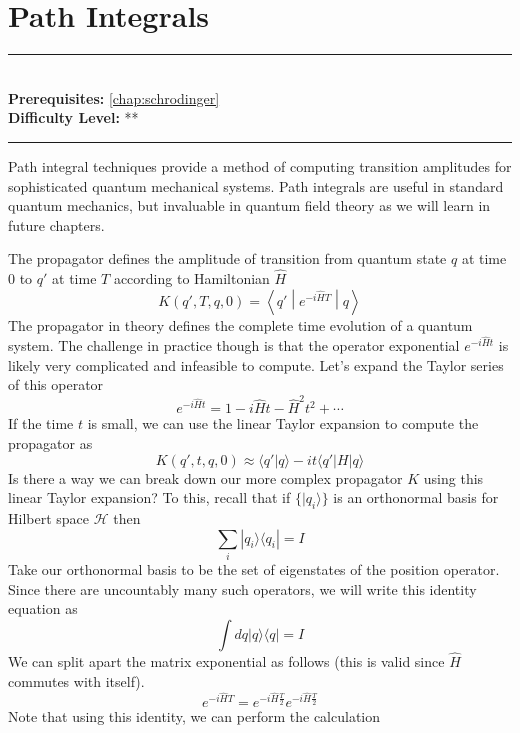 \documentclass[book.tex]{subfiles}
\begin{document}
\chapter{Path Integrals}

\label{chap:path_integrals}
\noindent\rule{11cm}{0.4pt} \\
\textbf{Prerequisites:}  \autoref{chap:schrodinger} \\
\textbf{Difficulty Level:} ** \\
\noindent\rule{11cm}{0.4pt}
\vspace{5mm}

Path integral techniques provide a method of computing transition amplitudes for sophisticated quantum mechanical systems. Path integrals are useful in standard quantum mechanics, but invaluable in quantum field theory as we will learn in future chapters.

The propagator defines the amplitude of transition from quantum state $q$ at time $0$ to $q'$ at time $T$ according to Hamiltonian $\hat{H}$
\begin{equation}
K(q', T, q, 0) = \left \langle q' \middle |e^{-i\hat{H} T} \middle | q \right \rangle 
\end{equation}
The propagator in theory defines the complete time evolution of a quantum system. The challenge in practice though is that the operator exponential $e^{-i\hat{H}t}$ is likely very complicated and infeasible to compute. Let's expand the Taylor series of this operator
\begin{equation}
    e^{-i\hat{H}t} = 1 - i\hat{H}t - \hat{H}^2 t^2 + \cdots 
\end{equation}
If the time $t$ is small, we can use the linear Taylor expansion to compute the propagator as
\begin{equation}
    K(q', t, q, 0) \approx \langle q' | q \rangle - it \langle q' | H | q \rangle 
\end{equation}
Is there a way we can break down our more complex propagator $K$ using this linear Taylor expansion? To this, recall that if $\{|q_i\rangle \}$ is an orthonormal basis for Hilbert space $\mathcal{H}$ then
\begin{equation}
    \sum_i | q_i \rangle \langle q_i | = I
\end{equation}
Take our orthonormal basis to be the set of eigenstates of the position operator. Since there are uncountably many such operators, we will write this identity equation as
\begin{equation}
    \int dq | q \rangle \langle q | = I
\end{equation}
We can split apart the matrix exponential as follows (this is valid since $\hat{H}$ commutes with itself).
\begin{equation}
    e^{-i\hat{H}T} = e^{-i\hat{H}\frac{T}{2}} e^{-i\hat{H}\frac{T}{2}} 
\end{equation}
Note that using this identity, we can perform the calculation
\end{document}
